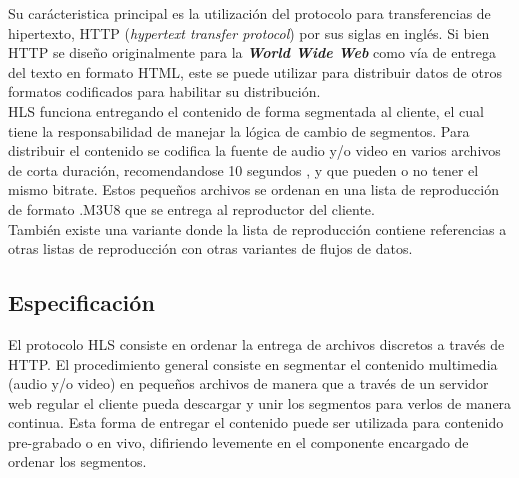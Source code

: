 Su carácteristica principal es la utilización del protocolo para transferencias de hipertexto, HTTP (\textit{hypertext transfer protocol}) por sus siglas en inglés. Si bien HTTP se diseño originalmente para la \textit{\textbf{World Wide Web}} como vía de entrega del texto en formato HTML, este se puede utilizar para distribuir datos de otros formatos codificados para habilitar su distribución.\\

HLS funciona entregando el contenido de forma segmentada al cliente, el cual tiene la responsabilidad de manejar la lógica de cambio de segmentos. Para distribuir el contenido se codifica la fuente de audio y/o video en varios archivos de corta duración, recomendandose 10 segundos \cite{bib:tensec-targetduration}, y que pueden o no tener el mismo bitrate. Estos pequeños archivos se ordenan en una lista de reproducción de formato .M3U8 que se entrega al reproductor del cliente. \\

También existe una variante donde la lista de reproducción contiene referencias a otras listas de reproducción con otras variantes de flujos de datos. \\

	\subsection{Especificación}
		El protocolo HLS consiste en ordenar la entrega de archivos discretos a través de HTTP.
		El procedimiento general consiste en segmentar el contenido multimedia (audio y/o video) en pequeños archivos de manera que a través de un servidor web regular el cliente pueda descargar y unir los segmentos para verlos de manera continua. Esta forma de entregar el contenido puede ser utilizada para contenido pre-grabado o en vivo, difiriendo levemente en el componente encargado de ordenar los segmentos.\\
		
